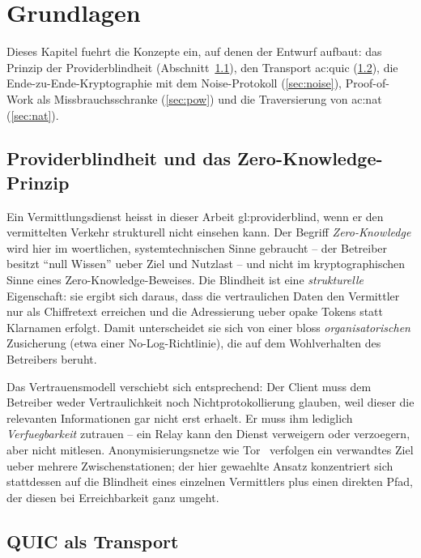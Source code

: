 \chapter{Grundlagen}
\label{ch:grundlagen}

Dieses Kapitel fuehrt die Konzepte ein, auf denen der Entwurf aufbaut: das
Prinzip der Providerblindheit (Abschnitt~\ref{sec:providerblind}), den
Transport \gls{ac:quic} (\ref{sec:quic}), die Ende-zu-Ende-Kryptographie mit dem
Noise-Protokoll (\ref{sec:noise}), Proof-of-Work als Missbrauchsschranke
(\ref{sec:pow}) und die Traversierung von \gls{ac:nat} (\ref{sec:nat}).

\section{Providerblindheit und das Zero-Knowledge-Prinzip}
\label{sec:providerblind}

Ein Vermittlungsdienst heisst in dieser Arbeit \gls{gl:providerblind}, wenn er
den vermittelten Verkehr strukturell nicht einsehen kann. Der Begriff
\emph{Zero-Knowledge} wird hier im woertlichen, systemtechnischen Sinne
gebraucht -- der Betreiber besitzt \enquote{null Wissen} ueber Ziel und Nutzlast
-- und nicht im kryptographischen Sinne eines Zero-Knowledge-Beweises. Die
Blindheit ist eine \emph{strukturelle} Eigenschaft: sie ergibt sich daraus, dass
die vertraulichen Daten den Vermittler nur als Chiffretext erreichen und die
Adressierung ueber opake Tokens statt Klarnamen erfolgt. Damit unterscheidet sie
sich von einer bloss \emph{organisatorischen} Zusicherung (etwa einer
No-Log-Richtlinie), die auf dem Wohlverhalten des Betreibers beruht.

Das Vertrauensmodell verschiebt sich entsprechend: Der Client muss dem Betreiber
weder Vertraulichkeit noch Nichtprotokollierung glauben, weil dieser die
relevanten Informationen gar nicht erst erhaelt. Er muss ihm lediglich
\emph{Verfuegbarkeit} zutrauen -- ein Relay kann den Dienst verweigern oder
verzoegern, aber nicht mitlesen. Anonymisierungsnetze wie
Tor~\cite{dingledine2004tor} verfolgen ein verwandtes Ziel ueber mehrere
Zwischenstationen; der hier gewaehlte Ansatz konzentriert sich stattdessen auf
die Blindheit eines einzelnen Vermittlers plus einen direkten Pfad, der diesen
bei Erreichbarkeit ganz umgeht.

\section{QUIC als Transport}
\label{sec:quic}

